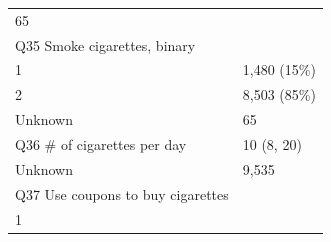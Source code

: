\documentclass[]{article}
\begin{document}
\begin{longtable}[]{@{}ll@{}}
\begin{minipage}[t]{0.23\columnwidth}
65\strut
\end{minipage}\tabularnewline
\begin{minipage}[t]{0.71\columnwidth}\raggedright
Q35 Smoke cigarettes, binary\strut
\end{minipage} & \begin{minipage}[t]{0.23\columnwidth}\raggedright
\strut
\end{minipage}\tabularnewline
\begin{minipage}[t]{0.71\columnwidth}\raggedright
1\strut
\end{minipage} & \begin{minipage}[t]{0.23\columnwidth}\raggedright
1,480 (15\%)\strut
\end{minipage}\tabularnewline
\begin{minipage}[t]{0.71\columnwidth}\raggedright
2\strut
\end{minipage} & \begin{minipage}[t]{0.23\columnwidth}\raggedright
8,503 (85\%)\strut
\end{minipage}\tabularnewline
\begin{minipage}[t]{0.71\columnwidth}\raggedright
Unknown\strut
\end{minipage} & \begin{minipage}[t]{0.23\columnwidth}\raggedright
65\strut
\end{minipage}\tabularnewline
\begin{minipage}[t]{0.71\columnwidth}\raggedright
Q36 \# of cigarettes per day\strut
\end{minipage} & \begin{minipage}[t]{0.23\columnwidth}\raggedright
10 (8, 20)\strut
\end{minipage}\tabularnewline
\begin{minipage}[t]{0.71\columnwidth}\raggedright
Unknown\strut
\end{minipage} & \begin{minipage}[t]{0.23\columnwidth}\raggedright
9,535\strut
\end{minipage}\tabularnewline
\begin{minipage}[t]{0.71\columnwidth}\raggedright
Q37 Use coupons to buy cigarettes\strut
\end{minipage} & \begin{minipage}[t]{0.23\columnwidth}\raggedright
\strut
\end{minipage}\tabularnewline
\begin{minipage}[t]{0.71\columnwidth}\raggedright
1\strut
\end{minipage} & \begin{minipage}[t]{0.23\columnwidth}\raggedright

\end{minipage}
\end{longtable}
\end{document}
